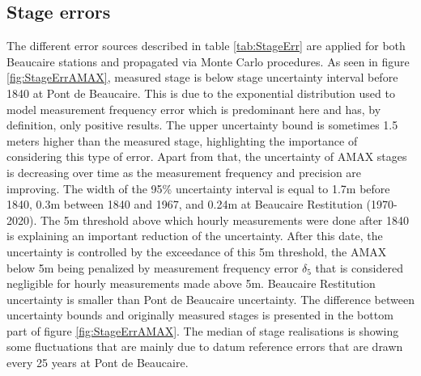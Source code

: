 \documentclass[11pt]{article}
\begin{document}
    \subsection{Stage errors}
    \label{sec:StageErrRes}
    
    The different error sources described in table \ref{tab:StageErr} are applied for both Beaucaire stations and propagated via Monte Carlo procedures. As seen in figure \ref{fig:StageErrAMAX}, measured stage is below stage uncertainty interval before 1840 at Pont de Beaucaire. This is due to the exponential distribution used to model measurement frequency error which is predominant here and has, by definition, only positive results. The upper uncertainty bound is sometimes 1.5 meters higher than the measured stage, highlighting the importance of considering this type of error. Apart from that, the uncertainty of AMAX stages is decreasing over time as the measurement frequency and precision are improving. The width of the 95\% uncertainty interval is equal to 1.7m before 1840, 0.3m between 1840 and 1967, and 0.24m at Beaucaire Restitution (1970-2020). The 5m threshold above which hourly measurements were done after 1840 is explaining an important reduction of the uncertainty. After this date, the uncertainty is controlled by the exceedance of this 5m threshold, the AMAX below 5m being penalized by measurement frequency error $\delta_5$ that is considered negligible for hourly measurements made above 5m. Beaucaire Restitution uncertainty is smaller than Pont de Beaucaire uncertainty. The difference between uncertainty bounds and originally measured stages is presented in the bottom part of figure \ref{fig:StageErrAMAX}. The median of stage realisations is showing some fluctuations that are mainly due to datum reference errors that are drawn every 25 years at Pont de Beaucaire.
    
\end{document}
